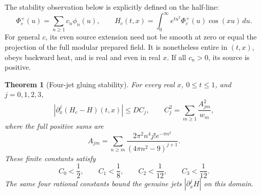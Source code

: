 \documentclass[11pt]{article}
\numberwithin{equation}{section}
\newtheorem{theorem}{Theorem}[section]
\theoremstyle{definition}
\theoremstyle{remark}
\begin{document}
The stability observation below is explicitly defined on the half-line:
\begin{equation}
 \Phi_c^+(u)=\sum_{n\geq1}c_n\phi_n(u),\qquad
 H_c(t,x)=\int_0^\infty e^{tu^2}\Phi_c^+(u)\cos(xu)\,du.
 \label{eq:perturbed-halfline}
\end{equation}
For general \(c\), its even source extension need not be smooth at
zero or equal the projection of the full modular prepared field.
It is nonetheless entire in \((t,x)\), obeys backward heat, and is real
and even in real \(x\).  If all \(c_n>0\), its source is positive.

\begin{theorem}[Four-jet gluing stability]
\label{thm:four-jet-gluing}
For every real \(x\), \(0\leq t\leq1\), and \(j=0,1,2,3\),
\begin{equation}
 |\partial_x^j(H_c-H)(t,x)|\leq DC_j,\qquad
 C_j^2=\sum_{m\geq1}\frac{A_{jm}^2}{w_m},
 \label{eq:four-jet-stability}
\end{equation}
where the full positive sums are
\[
 A_{jm}=\sum_{n\geq m}
 \frac{2\pi^2n^4j!e^{-\pi n^2}}{(4\pi n^2-9)^{j+1}}.
\]
These finite constants satisfy
\begin{equation}
 C_0<\frac12,\qquad C_1<\frac18,\qquad
 C_2<\frac1{12},\qquad C_3<\frac1{12}.
 \label{eq:four-jet-rational}
\end{equation}
The same four rational constants bound the genuine jets
\(|\partial_x^jH|\) on this domain.
\end{theorem}
\end{document}
